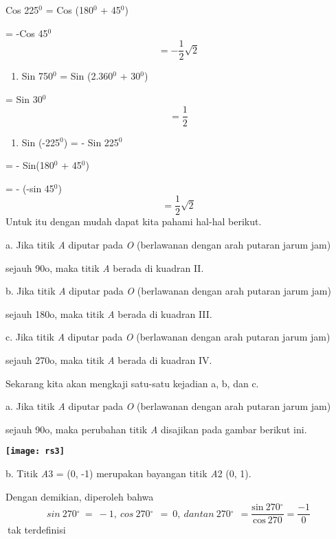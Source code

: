 \documentclass[11pt,fleqn]{book} %
\begin{document}
\begin{myEnumerate}
\begin{itemize}
Cos 225${}^{0}$ = Cos (180${}^{0}$ + 45${}^{0}$)

= -Cos 45${}^{0}$
\[           = -\frac{1}{2} \sqrt{2} \] 

\begin{enumerate}
\item  Sin 750${}^{0}$ = Sin (2.360${}^{0}$ + 30${}^{0}$)
\end{enumerate}

= Sin 30${}^{0}$
\[          = \frac{1}{2} \] 

\begin{enumerate}
\item  Sin (-225${}^{0}$) = - Sin 225${}^{0}$
\end{enumerate}

= - Sin(180${}^{0}$ + 45${}^{0}$)

= - (-sin 45${}^{0}$)
\[     = \frac{1}{2} \sqrt{2} \] 
Untuk itu dengan mudah dapat kita pahami hal-hal berikut.

\noindent a. Jika titik \textit{A }diputar pada \textit{O }(berlawanan dengan arah putaran jarum jam)

\noindent sejauh 90o, maka titik \textit{A }berada di kuadran II.

\noindent b. Jika titik \textit{A }diputar pada \textit{O }(berlawanan dengan arah putaran jarum jam)

\noindent sejauh 180o, maka titik \textit{A }berada di kuadran III.

\noindent c. Jika titik \textit{A }diputar pada \textit{O }(berlawanan dengan arah putaran jarum jam)

\noindent sejauh 270o, maka titik \textit{A }berada di kuadran IV.

\noindent \textbf{}

\noindent Sekarang kita akan mengkaji satu-satu kejadian a, b, dan c.

\noindent a. Jika titik \textit{A }diputar pada \textit{O }(berlawanan dengan arah putaran jarum jam)

\noindent sejauh 90o, maka perubahan titik \textit{A }disajikan pada gambar berikut ini.\textbf{}

\noindent \textbf{\texttt{[image: rs3]}}

\noindent b. Titik \textit{A}3 = (0, -1) merupakan bayangan titik \textit{A}2 (0, 1).

\noindent Dengan demikian, diperoleh bahwa
\[sin\ 270{}^\circ \ =\ -1,\ cos\ 270{}^\circ \ \ =\ 0,\ dantan\ 270{}^\circ \ \ =\frac{\mathrm{sin\ 270}{}^\circ }{\mathrm{cos\ 270}}\mathrm{=}\frac{\mathrm{-}\mathrm{1}}{0}\] 
$\ $tak terdefinisi


\end{itemize}
\end{myEnumerate}
\end{document}
